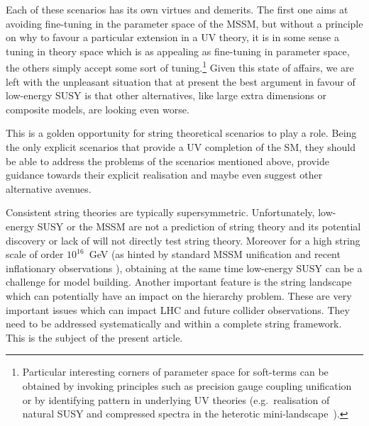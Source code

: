 \documentclass[11pt,a4paper]{article}
\begin{document}
Each of these scenarios has its own virtues and demerits. The first one aims at avoiding fine-tuning in the parameter space of the MSSM, but without a principle on why to favour a particular extension in a UV theory, it is in some sense a tuning in theory space which is as appealing as fine-tuning in parameter space, the others simply accept some sort of tuning.\footnote{Particular interesting corners of parameter space for soft-terms can be obtained by invoking principles such as precision gauge coupling unification~\cite{Krippendorf:2013dqa} or by identifying pattern in underlying UV theories (e.g.~realisation of natural SUSY and compressed spectra in the heterotic mini-landscape~\cite{Krippendorf:2012ir,Badziak:2012yg}).} Given this state of affairs, we are left with the unpleasant situation that at present the best argument
in favour of low-energy SUSY is that other alternatives, like large extra dimensions or composite models, are looking even worse.

This is a golden opportunity for string theoretical scenarios to play a role.
Being the only explicit scenarios that provide a UV completion of the SM,
they should be able to address the problems of the scenarios mentioned above,
provide guidance towards their explicit realisation and maybe even suggest other alternative avenues.

Consistent string theories are typically supersymmetric. Unfortunately, low-energy SUSY or the MSSM
are not a prediction of string theory and its potential discovery or lack of will not directly test string theory.
Moreover for a high string scale of order $10^{16}$~GeV (as hinted by standard MSSM unification and recent inflationary observations \cite{Ade:2014xna}),
obtaining at the same time low-energy SUSY can be a challenge for model building.
Another important feature is the string landscape which can potentially have an impact on the hierarchy problem.
These are very important issues which can impact LHC and future collider observations. They need to be addressed systematically
and within a complete string framework. This is the subject of the present article.
\end{document}
